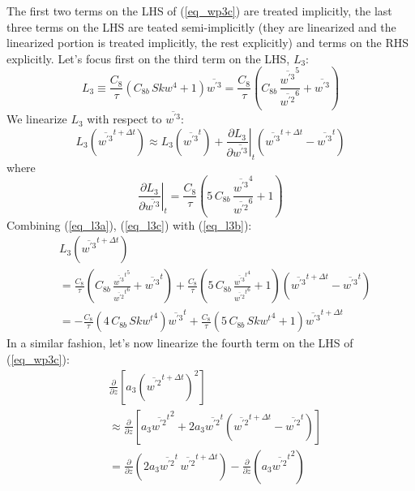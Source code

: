 \documentclass[11pt,fleqn]{article}
\newcommand{\ptlder}[2]{\frac{\partial #1}{\partial #2}}
\begin{document}
The first two terms on the LHS of (\ref{eq_wp3c}) are treated implicitly,
the last three terms on the LHS are teated semi-implicitly (they are linearized
and the linearized portion is treated implicitly, the rest explicitly)
and terms on the RHS explicitly. Let's focus first on the third term on the LHS, 
$L_3$:
%
\begin{equation}
\label{eq_l3a}
L_3
\equiv \frac{C_8}{\tau}\left( C_{8b} \, Skw^4 + 1 \right) \overline{w^{'3}}
=   \frac{C_8}{\tau}
    \left(  C_{8b} \, \frac{\overline{w^{'3}}^5}{\overline{w^{'2}}^6}
          + \overline{w^{'3}}
    \right)
\end{equation}
%
We linearize $L_3$ with respect to $\overline{w^{'3}}$:
%
\begin{equation}
\label{eq_l3b}
L_3 \left( \overline{w^{'3}}^{t+\Delta t} \right)
\approx L_3 \left( \overline{w^{'3}}^{t} \right)
+ \left. \ptlder{L_3}{\overline{w^{'3}}} \right|_{t}
  \left( \overline{w^{'3}}^{t+\Delta t} - \overline{w^{'3}}^{t} \right)
\end{equation}
%
where
%
\begin{equation}
\label{eq_l3c}
\left. \ptlder{L_3}{\overline{w^{'3}}} \right|_{t}
=   \frac{C_8}{\tau}
    \left(  5 \, C_{8b} \, \frac{\overline{w^{'3}}^4}{\overline{w^{'2}}^6}
          + 1
    \right)
\end{equation}
%
Combining (\ref{eq_l3a}), (\ref{eq_l3c}) with (\ref{eq_l3b}):
%
\begin{equation}
\label{eq_l3d}
\begin{split}
& L_3 \left( \overline{w^{'3}}^{t+\Delta t} \right) \\
&=   \frac{C_8}{\tau}
      \left(  C_{8b} \, \frac{{\overline{w^{'3}}^t}^5}{{\overline{w^{'2}}^t}^6}
            + \overline{w^{'3}}^t
      \right)
   + \frac{C_8}{\tau}
     \left(  5 \, C_{8b} \, \frac{{\overline{w^{'3}}^t}^4}{{\overline{w^{'2}}^t}^6}
           + 1
     \right)
     \left( \overline{w^{'3}}^{t + \Delta t} - \overline{w^{'3}}^t \right)  \\
&= - \frac{C_8}{\tau}
      \left(  4 \, C_{8b} \, {Skw^t}^4 \right) \overline{w^{'3}}^t
   + \frac{C_8}{\tau}
     \left(  5 \, C_{8b} \, {Skw^t}^4 + 1 \right)
      \overline{w^{'3}}^{t + \Delta t}
\end{split}
\end{equation}
%
In a similar fashion, let's now linearize the fourth term on the LHS of
(\ref{eq_wp3c}):
%
\begin{equation}
\label{eq_l4a}
\begin{split}
& \ptlder{}{z} \left[ a_3 \left(\overline{w^{'2}}^{t+\Delta t}\right)^2 \right] \\
&\approx  \ptlder{}{z} 
    \left[
      a_3 {\overline{w^{'2}}^t}^2
      + 2 a_3 \overline{w^{'2}}^t
              \left( \overline{w^{'2}}^{t+\Delta t} - \overline{w^{'2}}^{t} \right) 
    \right] \\
&= \ptlder{}{z} \left( 2 a_3 \overline{w^{'2}}^t \, \overline{w^{'2}}^{t+\Delta t} \right)
 - \ptlder{}{z} \left( a_3 {\overline{w^{'2}}^t}^2 \right)
\end{split}
\end{equation}
\end{document}

